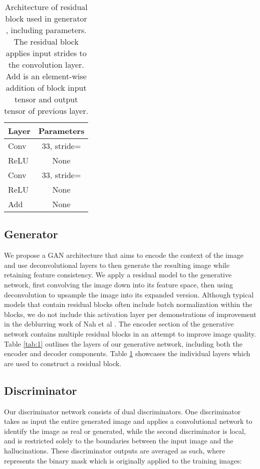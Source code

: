 \documentclass{article}
\begin{document}
\begin{table}[h] 
  \centering  
    \begin{tabular}{lc}  
    \hline
    \textbf{Layer} & \textbf{Parameters}\\ 
    \hline \hline
      Conv & 33, stride= \\
    \hline
      ReLU & None \\
    \hline
      Conv & 33, stride= \\
    \hline
      ReLU & None \\
    \hline
      Add & None \\
    \hline
    \end{tabular}
  
  \caption{Architecture of residual block used in generator , including parameters. The residual block applies input strides  to the convolution layer. Add is an element-wise addition of block input tensor  and output tensor of previous layer.} 
  \label{tab:2}
\end{table}

\subsection{Generator}
We propose a GAN architecture that aims to encode the context of the image and use deconvolutional layers to then generate the resulting image while retaining feature consistency. We apply a residual model to the generative network, first convolving the image down into its feature space, then using deconvolution to upsample the image into its expanded version. Although typical models that contain residual blocks often include batch normalization within the blocks, we do not include this activation layer per demonstrations of improvement in the deblurring work of Nah et al \citep{nah_deep_2018}. The encoder section of the generative network contains multiple residual blocks in an attempt to improve image quality. Table \ref{tab:1} outlines the layers of our generative network, including both the encoder and decoder components. Table \ref{tab:2} showcases the individual layers which are used to construct a residual block.

\subsection{Discriminator}
Our discriminator network  consists of dual discriminators. One discriminator  takes as input the entire generated image and applies a convolutional network to identify the image as real or generated, while the second discriminator  is local, and is restricted solely to the boundaries between the input image and the hallucinations. These discriminator outputs are averaged as such, where  represents the binary mask which is originally applied to the training images: 
\end{document}
